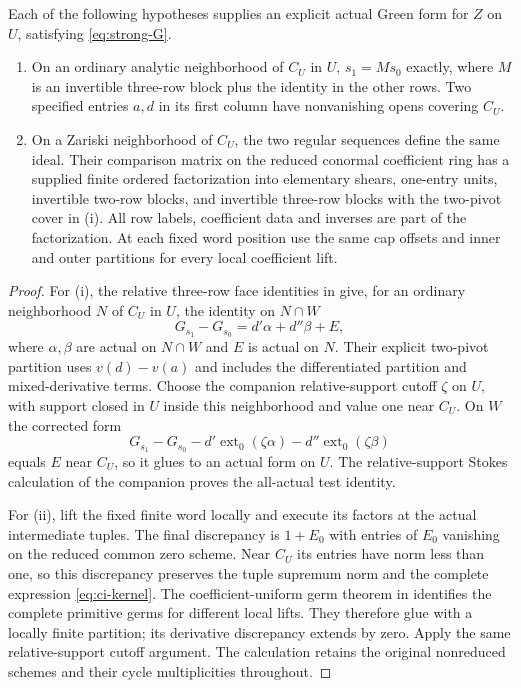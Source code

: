 \begin{proposition}\label{prop:ci-cancellation}
Each of the following hypotheses supplies an explicit actual
Green form for $Z$ on $U$, satisfying \eqref{eq:strong-G}.
\begin{enumerate}[label=\textup{(\roman*)}]
\item On an ordinary analytic neighborhood of $C_U$ in $U$,
$s_1=Ms_0$ exactly, where $M$ is an invertible three-row block
plus the identity in the other rows. Two specified entries $a,d$
in its first column have nonvanishing opens covering $C_U$.
\item On a Zariski neighborhood of $C_U$, the two regular
sequences define the same ideal. Their comparison matrix on the
reduced conormal coefficient ring has a supplied finite ordered
factorization into elementary shears, one-entry units, invertible
two-row blocks, and invertible three-row blocks with the two-pivot
cover in \textup{(i)}. All row labels, coefficient data and inverses
are part of the factorization. At each fixed word position use
the same cap offsets and inner and outer partitions for every
local coefficient lift.
\end{enumerate}
\end{proposition}

\begin{proof}
For (i), the relative three-row face identities in
\cite{InternalTropical} give, for an ordinary neighborhood $N$
of $C_U$ in $U$, the identity on $N\cap W$
\[
 G_{s_1}-G_{s_0}=d'\alpha+d''\beta+E,
\]
where $\alpha,\beta$ are actual on $N\cap W$ and $E$ is
actual on $N$. Their explicit
two-pivot partition uses $v(d)-v(a)$ and includes the differentiated
partition and mixed-derivative terms. Choose the companion
relative-support cutoff $\zeta$ on $U$, with support closed in
$U$ inside this neighborhood and value one near $C_U$.
On $W$ the corrected form
\[
 G_{s_1}-G_{s_0}
 -d'\operatorname{ext}_0(\zeta\alpha)
 -d''\operatorname{ext}_0(\zeta\beta)
\]
equals $E$ near $C_U$, so it glues to an actual form on $U$.
The relative-support Stokes calculation of the companion proves
the all-actual test identity.

For (ii), lift the fixed finite word locally and execute its
factors at the actual intermediate tuples. The final discrepancy
is $1+E_0$ with entries of $E_0$ vanishing on the reduced common
zero scheme. Near $C_U$ its entries have norm less than one, so
this discrepancy preserves the tuple supremum norm and the
complete expression \eqref{eq:ci-kernel}. The coefficient-uniform
germ theorem in \cite{InternalTropical} identifies the complete
primitive germs for different local lifts. They therefore glue
with a locally finite partition; its derivative discrepancy
extends by zero. Apply the same relative-support cutoff argument.
The calculation retains the original nonreduced schemes and their
cycle multiplicities throughout.
\end{proof}

